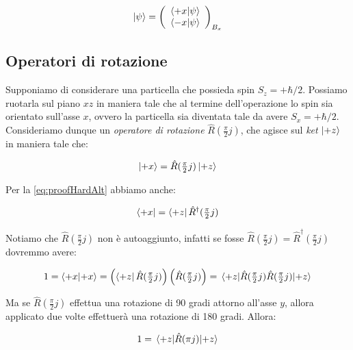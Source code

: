 	\begin{equation}
		\ket{\psi} =
			\left ( \begin{array}{c}
				\braket{+x}{\psi} \\
				\braket{-x}{\psi}
			\end{array} \right )_{B_x}
	\end{equation}

\subsection{Operatori di rotazione}

Supponiamo di considerare una particella che possieda spin $S_z = + \hbar / 2$. Possiamo ruotarla sul piano $xz$ in maniera tale che al termine dell'operazione lo spin sia orientato sull'asse $x$, ovvero la particella sia diventata tale da avere $S_x = + \hbar / 2 $. Consideriamo dunque un \textit{operatore di rotazione} $\hat{R}(\frac{\pi}{2} j)$, che agisce sul \textit{ket} $\ket{+z}$ in maniera tale che:

	\begin{equation} \label{eq:rotationOperatorGeneric}
		\ket{+x} = \hat{R}(\tfrac{\pi}{2} j) \ket{+z}
	\end{equation} 

Per la \eqref{eq:proofHardAlt} abbiamo anche:

	\begin{equation} \label{eq:rotationOperatorAdjoint}
		\bra{+x} = \bra{+z} \hat{R}^\dagger(\tfrac{\pi}{2} j)
	\end{equation}

	Notiamo che $ \hat{R}( \tfrac{\pi}{2} j) $ non \`e autoaggiunto, infatti se fosse $ \hat{R}(\tfrac{\pi}{2} j) = \hat{R}^\dagger(\tfrac{\pi}{2} j)$ dovremmo avere:
	
	\begin{equation}
	 	1 = \braket{+x}{+x} = \left( \bra{+z} \hat{R}(\tfrac{\pi}{2} j) \right ) \left (\hat{R}(\tfrac{\pi}{2} j) \right ) = \mel{+z}{\hat{R}(\tfrac{\pi}{2} j)\hat{R}(\tfrac{\pi}{2} j) }{+z} 
	\end{equation} 

Ma se $ \hat{R}(\tfrac{\pi}{2} j )$ effettua una rotazione di 90 gradi attorno all'asse $y$, allora applicato due volte effettuer\`a una rotazione di 180 gradi. Allora:

	\begin{equation} \label{eq:rotationNotHermitian}
		1 = \mel{+z}{\hat{R}(\pi j ) }{+z}
	\end{equation}

